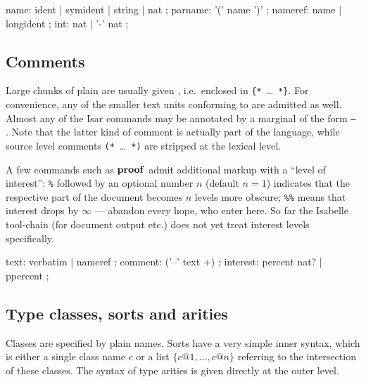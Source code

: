 \begin{rail}
  name: ident | symident | string | nat
  ;
  parname: '(' name ')'
  ;
  nameref: name | longident
  ;
  int: nat | '-' nat
  ;
\end{rail}


\subsection{Comments}\label{sec:comments}

Large chunks of plain  are usually given
, i.e.\ enclosed in \verb|{*|~\dots~\verb|*}|.  For
convenience, any of the smaller text units conforming to 
are admitted as well.  Almost any of the Isar commands may be annotated by a
marginal  of the form \texttt{--} .
Note that the latter kind of comment is actually part of the language, while
source level comments \verb|(*|~\dots~\verb|*)| are stripped at the lexical
level.

A few commands such as ${\mathord{\mathbf{proof}}}$ admit additional markup with a ``level of
interest'': \texttt{\%} followed by an optional number $n$ (default $n = 1$)
indicates that the respective part of the document becomes $n$ levels more
obscure; \texttt{\%\%} means that interest drops by $\infty$ --- abandon every
hope, who enter here.  So far the Isabelle tool-chain (for document output
etc.) does not yet treat interest levels specifically.

\begin{rail}
  text: verbatim | nameref
  ;
  comment: ('--' text +)
  ;
  interest: percent nat? | ppercent
  ;
\end{rail}


\subsection{Type classes, sorts and arities}

Classes are specified by plain names.  Sorts have a very simple inner syntax,
which is either a single class name $c$ or a list $\{c@1, \dots, c@n\}$
referring to the intersection of these classes.  The syntax of type arities is
given directly at the outer level.


